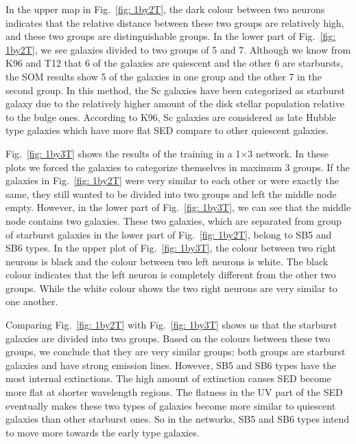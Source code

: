         
            In the upper map in Fig.~\ref{fig: 1by2T}, the dark colour between two neurons indicates that the relative distance between these two groups are relatively high, and these two groups are distinguishable groups.
            In the lower part of Fig.~\ref{fig: 1by2T}, we see galaxies divided to two groups of 5 and 7.
            Although we know from K96 and T12 that 6 of the galaxies are quiescent and the other 6 are starbursts, the SOM results show 5 of the galaxies in one group and the other 7 in the second group.
            In this method, the Sc galaxies have been categorized as starburst galaxy due to the relatively higher amount of the disk stellar population relative to the bulge ones. 
            According to K96, Sc galaxies are considered as late Hubble type galaxies which have more flat SED compare to other quiescent galaxies. 
            

            Fig.~\ref{fig: 1by3T} shows the results of the training in a 1$\times$3 network.
            In these plots we forced the galaxies to categorize themselves in maximum 3 groups. 
            If the galaxies in Fig.~\ref{fig: 1by2T} were very similar to each other or were exactly the same, they still wanted to be divided into two groups and left the middle node empty. 
            However, in the lower part of Fig.~\ref{fig: 1by3T}, we can see that the middle node contains two galaxies.
            These two galaxies, which are separated from group of starburst galaxies in the lower part of Fig.~\ref{fig: 1by2T}, belong to SB5 and SB6 types.
            In the upper plot of Fig.~\ref{fig: 1by3T}, the colour between two right neurons is black and the colour between two left neurons is white. 
            The black colour indicates that the left neuron is completely different from the other two groups.
            While the white colour shows the two right neurons are very similar to one another. 
            
            Comparing Fig.~\ref{fig: 1by2T} with Fig.~\ref{fig: 1by3T} shows us that the starburst galaxies are divided into two groups. 
            Based on the colours between these two groups, we conclude that they are very similar groups; both groups are starburst galaxies and have strong emission lines.
            However, SB5 and SB6 types have the most internal extinctions.
            The high amount of extinction causes SED become more flat at shorter wavelength regions.
            The flatness in the UV part of the SED eventually makes these two types of galaxies become more similar to quiescent galaxies than other starburst ones.
            So in the networks, SB5 and SB6 types intend to move more towards the early type galaxies.
                
